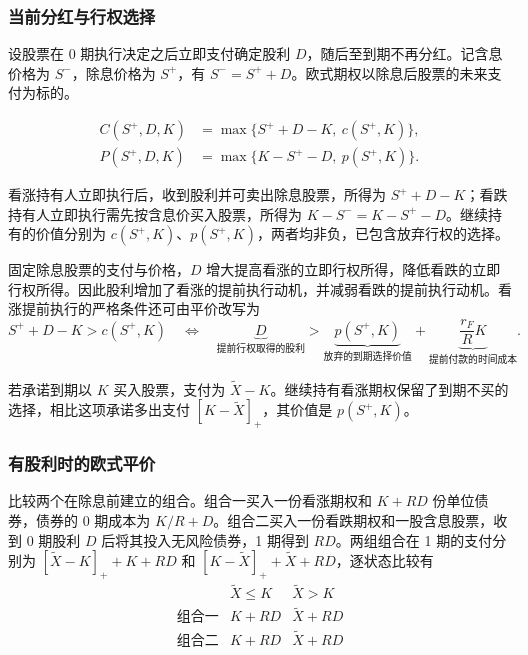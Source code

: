 \subsubsection{当前分红与行权选择}
\begin{tcolorbox}[knowledge,title=含息价格与除息价格]
设股票在 0 期执行决定之后立即支付确定股利 $D$，随后至到期不再分红。记含息价格为 $S^-$，除息价格为 $S^+$，有 $S^-=S^++D$。欧式期权以除息后股票的未来支付为标的。
\end{tcolorbox}
\begin{tcolorbox}[knowledge,title=当前分红下的美式期权]
\[
 \begin{aligned}
 C(S^+,D,K)&=\max\{S^++D-K,\ c(S^+,K)\},\\
 P(S^+,D,K)&=\max\{K-S^+-D,\ p(S^+,K)\}.
 \end{aligned}
\]
\end{tcolorbox}
看涨持有人立即执行后，收到股利并可卖出除息股票，所得为 $S^++D-K$；看跌持有人立即执行需先按含息价买入股票，所得为 $K-S^-=K-S^+-D$。继续持有的价值分别为 $c(S^+,K)$、$p(S^+,K)$，两者均非负，已包含放弃行权的选择。

固定除息股票的支付与价格，$D$ 增大提高看涨的立即行权所得，降低看跌的立即行权所得。因此股利增加了看涨的提前执行动机，并减弱看跌的提前执行动机。看涨提前执行的严格条件还可由平价改写为
\[
 S^++D-K>c(S^+,K)
 \quad\Longleftrightarrow\quad
 \underbrace{D}_{\text{提前行权取得的股利}}
 >\underbrace{p(S^+,K)}_{\text{放弃的到期选择价值}}
  +\underbrace{\frac{r_F}{R}K}_{\text{提前付款的时间成本}}.
\]

若承诺到期以 $K$ 买入股票，支付为 $\tilde X-K$。继续持有看涨期权保留了到期不买的选择，相比这项承诺多出支付 $[K-\tilde X]_+$，其价值是 $p(S^+,K)$。

\subsubsection{有股利时的欧式平价}
比较两个在除息前建立的组合。组合一买入一份看涨期权和 $K+RD$ 份单位债券，债券的 0 期成本为 $K/R+D$。组合二买入一份看跌期权和一股含息股票，收到 0 期股利 $D$ 后将其投入无风险债券，1 期得到 $RD$。两组组合在 1 期的支付分别为 $[\tilde X-K]_++K+RD$ 和 $[K-\tilde X]_++\tilde X+RD$，逐状态比较有
\[
\begin{array}{c|cc}
 & \tilde X\le K & \tilde X>K\\\hline
 \text{组合一} & K+RD & \tilde X+RD\\
 \text{组合二} & K+RD & \tilde X+RD
\end{array}
\]

